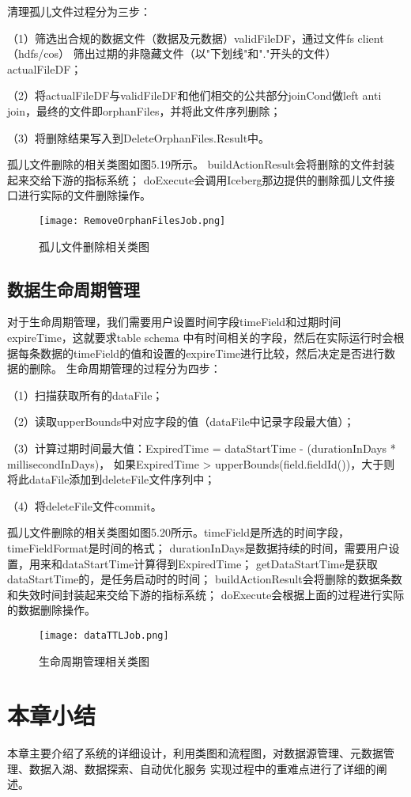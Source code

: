 清理孤⼉⽂件过程分为三步：

（1）筛选出合规的数据⽂件（数据及元数据）validFileDF，通过⽂件fs client（hdfs/cos）
筛出过期的⾮隐藏⽂件（以"下划线"和"."开头的⽂件）actualFileDF；

（2）将actualFileDF与validFileDF和他们相交的公共部分joinCond做left anti join，最终的⽂件即orphanFiles，并将此⽂件序列删除；

（3）将删除结果写⼊到DeleteOrphanFiles.Result中。

孤儿文件删除的相关类图如图5.19所示。
buildActionResult会将删除的文件封装起来交给下游的指标系统；
doExecute会调用Iceberg那边提供的删除孤儿文件接口进行实际的文件删除操作。

\begin{figure}[h]
  \centering
  \texttt{[image: RemoveOrphanFilesJob.png]}
  \caption{孤儿文件删除相关类图}
  \label{fig:badge}
\end{figure}

\subsection{数据生命周期管理}

对于生命周期管理，我们需要用户设置时间字段timeField和过期时间expireTime，这就要求table schema
中有时间相关的字段，然后在实际运行时会根据每条数据的timeField的值和设置的expireTime进行比较，然后决定是否进行数据的删除。
生命周期管理的过程分为四步：

（1）扫描获取所有的dataFile；

（2）读取upperBounds中对应字段的值（dataFile中记录字段最大值）；

（3）计算过期时间最大值：ExpiredTime = dataStartTime - (durationInDays * millisecondInDays)，
如果ExpiredTime > upperBounds(field.fieldId())，大于则将此dataFile添加到deleteFile文件序列中；

（4）将deleteFile文件commit。

孤儿文件删除的相关类图如图5.20所示。timeField是所选的时间字段，timeFieldFormat是时间的格式；
durationInDays是数据持续的时间，需要用户设置，用来和dataStartTime计算得到ExpiredTime；
getDataStartTime是获取dataStartTime的，是任务启动时的时间；
buildActionResult会将删除的数据条数和失效时间封装起来交给下游的指标系统；
doExecute会根据上面的过程进行实际的数据删除操作。

\begin{figure}[h]
  \centering
  \texttt{[image: dataTTLJob.png]}
  \caption{生命周期管理相关类图}
  \label{fig:badge}
\end{figure}

\section{本章小结}

本章主要介绍了系统的详细设计，利用类图和流程图，对数据源管理、元数据管理、数据入湖、数据探索、自动优化服务
实现过程中的重难点进行了详细的阐述。
